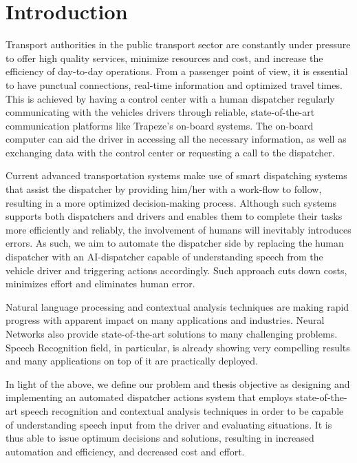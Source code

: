 \chapter{Introduction}
\label{chap:intro}

Transport authorities in the public transport sector are constantly under pressure to offer high quality services, minimize resources and cost, and increase the efficiency of day-to-day operations. From a passenger point of view, it is essential to have punctual connections, real-time information and optimized travel times. This is achieved by having a control center with a human dispatcher regularly communicating with the vehicles drivers through reliable, state-of-the-art communication platforms like Trapeze's on-board systems. The on-board computer can aid the driver in accessing all the necessary information, as well as exchanging data with the control center or requesting a call to the dispatcher. 

Current advanced transportation systems make use of smart dispatching systems that assist the dispatcher by providing him/her with a work-flow to follow, resulting in a more optimized decision-making process. Although such systems supports both dispatchers and drivers and enables them to complete their tasks more efficiently and reliably, the involvement of humans will inevitably introduces errors. As such, we aim to automate the dispatcher side by replacing the human dispatcher with an \ac{AI}-dispatcher capable of understanding speech from the vehicle driver and triggering actions accordingly. Such approach cuts down costs, minimizes effort and eliminates human error. 


Natural language processing and contextual analysis techniques are making rapid progress with apparent impact on many applications and industries. Neural Networks also provide state-of-the-art solutions to many challenging problems. Speech Recognition field, in particular, is already showing very compelling results and many applications on top of it are practically deployed.


In light of the above, we define our problem and thesis objective as designing and implementing an automated dispatcher actions system that employs state-of-the-art speech recognition and contextual analysis techniques in order to be capable of understanding speech input from the driver and evaluating situations. It is thus able to issue optimum decisions and solutions, resulting in increased automation and efficiency, and decreased cost and effort.

